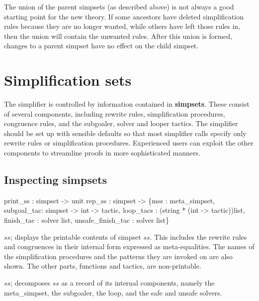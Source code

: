 \begin{warn}
  The union of the parent simpsets (as described above) is not always
  a good starting point for the new theory.  If some ancestors have
  deleted simplification rules because they are no longer wanted,
  while others have left those rules in, then the union will contain
  the unwanted rules.  After this union is formed, changes to 
  a parent simpset have no effect on the child simpset.
\end{warn}


\section{Simplification sets} 

The simplifier is controlled by information contained in {\bf
  simpsets}.  These consist of several components, including rewrite
rules, simplification procedures, congruence rules, and the subgoaler,
solver and looper tactics.  The simplifier should be set up with
sensible defaults so that most simplifier calls specify only rewrite
rules or simplification procedures.  Experienced users can exploit the
other components to streamline proofs in more sophisticated manners.

\subsection{Inspecting simpsets}
\begin{ttbox}
print_ss : simpset -> unit
rep_ss   : simpset -> \{mss        : meta_simpset, 
                       subgoal_tac: simpset  -> int -> tactic,
                       loop_tacs  : (string * (int -> tactic))list,
                       finish_tac : solver list,
                unsafe_finish_tac : solver list\}
\end{ttbox}
\begin{ttdescription}
  
\item[\ttindexbold{print_ss} $ss$;] displays the printable contents of
  simpset $ss$.  This includes the rewrite rules and congruences in
  their internal form expressed as meta-equalities.  The names of the
  simplification procedures and the patterns they are invoked on are
  also shown.  The other parts, functions and tactics, are
  non-printable.

\item[\ttindexbold{rep_ss} $ss$;] decomposes $ss$ as a record of its internal 
  components, namely the meta_simpset, the subgoaler, the loop, and the safe
  and unsafe solvers.

\end{ttdescription}


